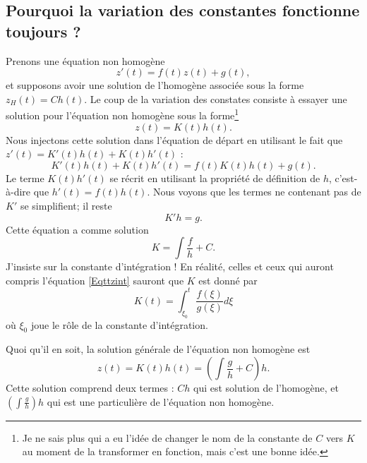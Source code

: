 \subsection{Pourquoi la variation des constantes fonctionne toujours ?}

Prenons une équation non homogène
\begin{equation}        \label{EqAstNNHomo}
	z'(t)=f(t)z(t)+g(t),
\end{equation}
et supposons avoir une solution de l'homogène associée sous la forme \( z_H(t)=Ch(t)\). Le coup de la variation des constates consiste à essayer une solution pour l'équation non homogène sous la forme\footnote{Je ne sais plus qui a eu l'idée de changer le nom de la constante de \( C\) vers \( K\) au moment de la transformer en fonction, mais c'est une bonne idée.}
\begin{equation}
	z(t)=K(t)h(t).
\end{equation}
Nous injectons cette solution dans l'équation de départ en utilisant le fait que \( z'(t)=K'(t)h(t)+K(t)h'(t)\) :
\begin{equation}
	K'(t)h(t)+K(t)h'(t)=f(t)K(t)h(t)+g(t).
\end{equation}
Le terme \( K(t)h'(t)\) se récrit en utilisant la propriété de définition de \( h\), c'est-à-dire que \( h'(t)=f(t)h(t)\). Nous voyons que les termes ne contenant pas de \( K'\) se simplifient; il reste
\begin{equation}
	K'h=g.
\end{equation}
Cette équation a comme solution
\begin{equation}
	K=\int \frac{ f }{ h }+C.
\end{equation}
J'insiste sur la constante d'intégration ! En réalité, celles et ceux qui auront compris l'équation \eqref{Eqttzint} sauront que \( K\) est donné par
\begin{equation}
	K(t)=\int_{\xi_0}^{t}\frac{ f(\xi) }{ g(\xi) }d\xi
\end{equation}
où \( \xi_0\) joue le rôle de la constante d'intégration.

Quoi qu'il en soit, la solution générale de l'équation non homogène est
\begin{equation}        \label{EqSolVarCosntCool}
	z(t)=K(t)h(t)=\left( \int\frac{ g }{ h }+C \right)h.
\end{equation}
Cette solution comprend deux termes : \( Ch\) qui est solution de l'homogène, et \( \left( \int \frac{ g }{ h } \right)h\) qui est une particulière de l'équation non homogène.

